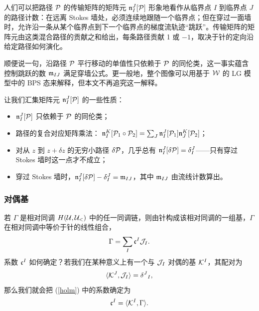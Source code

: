 人们可以把路径 $\P$ 的传输矩阵的矩阵元 $\frak{n}_I^J[ \P ]$ 形象地看作从临界点 $I$ 到临界点 $J$ 的路径计数：在远离 Stokes 墙处，必须连续地跟随一个临界点；但在穿过一面墙时，允许沿一条从某个临界点到下一个临界点的梯度流轨迹“跳跃”。传输矩阵的矩阵元由这类混合路径的贡献之和给出，每条路径贡献 1 或 $-1$，取决于针的定向沿给定路径如何演化。


顺便说一句，沿路径 $\P$ 平行移动的单值性只依赖于 $\P$ 的同伦类，这一事实蕴含控制跳跃的数 $\frak{m}_{IJ}$ 满足穿墙公式。更一般地，整个图像可以用基于 $\W$ 的 LG 模型中的 BPS 态来解释，但本文不再追究这一解释。

让我们汇集矩阵元 $\frak{n}_I^J[ \P ]$ 的一些性质：
\begin{itemize}
 \item $\frak{n}_I^J[ \P ]$ 只依赖于 $\P$ 的同伦类；
  \item 路径的复合对应矩阵乘法：
  $\frak{n}_I^K[ \P_1 \circ \P_2 ]= \sum_J\frak{n}_I^J[ \P_1 ]\frak{n}_J^K[ \P_2 ]$；
  \item 对从 $z$ 到 $z + \delta z$ 的无穷小路径 $\delta \P$，几乎总有 $\frak{n}_I^J[ \delta \P ] = \delta_I^J$——只有穿过 Stokes 墙时这一点才不成立；
  \item 穿过 Stokes 墙时，$\frak{n}_I^J[ \delta \P ] - \delta_I^J = \frak{m}_{IJ}$，其中 $\frak{m}_{IJ}$ 由流线计数算出。
\end{itemize}

\subsubsection{对偶基}\label{dual}


若 $\Gamma$ 是相对同调 $H(\U,\U_<)$ 中的任一同调链，则由针构成该相对同调的一组基，$\Gamma$ 在相对同调中等价于针的线性组合，
 \begin{equation}\label{holm} \Gamma=\sum_I\frak c^I \J_I.\end{equation}
系数 $\frak c^I$ 如何确定？若我们在某种意义上有一个与 $\J_I$ 对偶的基 $\K^I$，其配对为
\begin{equation}\label{oggo} \langle \K^J,\J_I\rangle=\delta^J{}_I,\end{equation}
那么我们就会把 (\ref{holm}) 中的系数确定为
\begin{equation}\label{ggo} \frak c^I=\langle \K^I,\Gamma\rangle.\end{equation}

